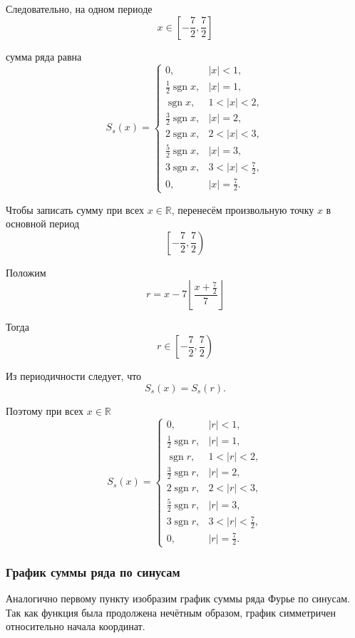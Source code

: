 \documentclass[12pt,a4paper]{article}
\begin{document}
Следовательно, на одном периоде
\[
x\in\left[-\frac72,\frac72\right]
\]

сумма ряда равна
\[
S_s(x)=
\begin{cases}
0, & |x|<1,\\[2mm]
\frac12\operatorname{sgn}x, & |x|=1,\\[2mm]
\operatorname{sgn}x, & 1<|x|<2,\\[2mm]
\frac32\operatorname{sgn}x, & |x|=2,\\[2mm]
2\operatorname{sgn}x, & 2<|x|<3,\\[2mm]
\frac52\operatorname{sgn}x, & |x|=3,\\[2mm]
3\operatorname{sgn}x, & 3<|x|<\frac72,\\[2mm]
0, & |x|=\frac72.
\end{cases}
\]

Чтобы записать сумму при всех \(x\in\mathbb R\), перенесём произвольную
точку \(x\) в основной период
\[
\left[-\frac72,\frac72\right)
\]

Положим
\[
r=x-7\left\lfloor\frac{x+\frac72}{7}\right\rfloor
\]

Тогда
\[
r\in\left[-\frac72,\frac72\right)
\]

Из периодичности следует, что
\[
S_s(x)=S_s(r).
\]

Поэтому при всех \(x\in\mathbb R\)
\[
S_s(x)=
\begin{cases}
0, & |r|<1,\\[2mm]
\frac12\operatorname{sgn}r, & |r|=1,\\[2mm]
\operatorname{sgn}r, & 1<|r|<2,\\[2mm]
\frac32\operatorname{sgn}r, & |r|=2,\\[2mm]
2\operatorname{sgn}r, & 2<|r|<3,\\[2mm]
\frac52\operatorname{sgn}r, & |r|=3,\\[2mm]
3\operatorname{sgn}r, & 3<|r|<\frac72,\\[2mm]
0, & |r|=\frac72.
\end{cases}
\]

\newpage

\subsubsection*{График суммы ряда по синусам}

Аналогично первому пункту изобразим график суммы ряда Фурье по синусам.
Так как функция была продолжена нечётным образом, график симметричен
относительно начала координат.
\end{document}
